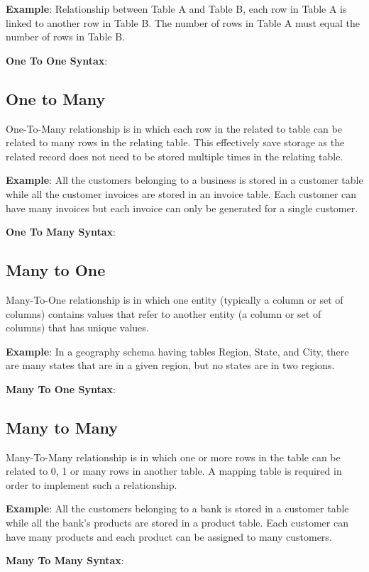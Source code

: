 	\textbf{Example}: Relationship between Table A and Table B, each row in Table A is linked to another row in Table B. The number of rows in Table A must equal the number of rows in Table B.

	\textbf{One To One Syntax}: 
		

	\subsection{One to Many}
	One-To-Many relationship is in which each row in the related to table can be related to many rows in the relating table. This effectively save storage as the related record does not need to be stored multiple times in the relating table.

	\textbf{Example}: All the customers belonging to a business is stored in a customer table while all the customer invoices are stored in an invoice table. Each customer can have many invoices but each invoice can only be generated for a single customer.	
			
	\textbf{One To Many Syntax}: 
		

	\subsection{Many to One}
	Many-To-One relationship is in which one entity (typically a column or set of columns) contains values that refer to another entity (a column or set of columns) that has unique values.

	\textbf{Example}: In a geography schema having tables Region, State, and City, there are many states that are in a given region, but no states are in two regions.
	
	\textbf{Many To One Syntax}: 
		

	\subsection{Many to Many}
	Many-To-Many relationship is in which one or more rows in the table can be related to 0, 1 or many rows in another table. A mapping table is required in order to implement  such a relationship.

	\textbf{Example}: All the customers belonging to a bank is stored in a customer table while all the bank's products are stored in a product table. Each customer can have many products and each product can be assigned to many customers.
	
	\textbf{Many To Many Syntax}: 
		


